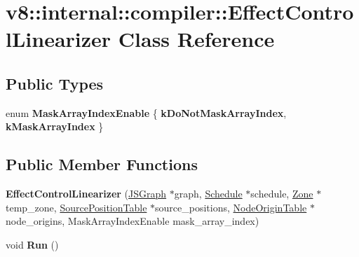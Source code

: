 \hypertarget{classv8_1_1internal_1_1compiler_1_1EffectControlLinearizer}{}\section{v8\+:\+:internal\+:\+:compiler\+:\+:Effect\+Control\+Linearizer Class Reference}
\label{classv8_1_1internal_1_1compiler_1_1EffectControlLinearizer}
\subsection*{Public Types}
\begin{DoxyCompactItemize}
\item 
\mbox{\label{classv8_1_1internal_1_1compiler_1_1EffectControlLinearizer_a8fb00957401a96a20d747900e690cd0d}} 
enum {\bfseries Mask\+Array\+Index\+Enable} \{ {\bfseries k\+Do\+Not\+Mask\+Array\+Index}, 
{\bfseries k\+Mask\+Array\+Index}
 \}
\end{DoxyCompactItemize}
\subsection*{Public Member Functions}
\begin{DoxyCompactItemize}
\item 
\mbox{\label{classv8_1_1internal_1_1compiler_1_1EffectControlLinearizer_acbe4618bb4ac2206b4fff08ba9f5c719}} 
{\bfseries Effect\+Control\+Linearizer} (\mbox{\hyperlink{classv8_1_1internal_1_1compiler_1_1JSGraph}{J\+S\+Graph}} $\ast$graph, \mbox{\hyperlink{classv8_1_1internal_1_1compiler_1_1Schedule}{Schedule}} $\ast$schedule, \mbox{\hyperlink{classv8_1_1internal_1_1Zone}{Zone}} $\ast$temp\+\_\+zone, \mbox{\hyperlink{classv8_1_1internal_1_1compiler_1_1SourcePositionTable}{Source\+Position\+Table}} $\ast$source\+\_\+positions, \mbox{\hyperlink{classv8_1_1internal_1_1compiler_1_1NodeOriginTable}{Node\+Origin\+Table}} $\ast$node\+\_\+origins, Mask\+Array\+Index\+Enable mask\+\_\+array\+\_\+index)
\item 
\mbox{\label{classv8_1_1internal_1_1compiler_1_1EffectControlLinearizer_a0b8094e555107a310d24e6160255acc3}} 
void {\bfseries Run} ()
\end{DoxyCompactItemize}


